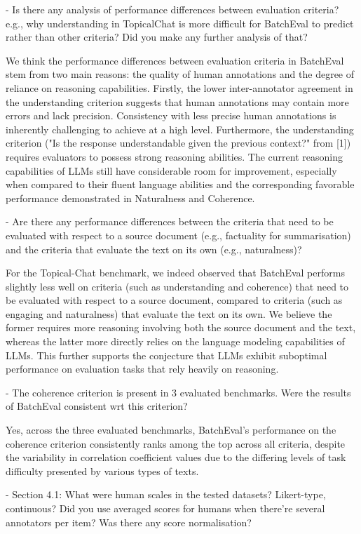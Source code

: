 - Is there any analysis of performance differences between evaluation criteria? e.g., why understanding in TopicalChat is more difficult for BatchEval to predict rather than other criteria? Did you make any further analysis of that?

We think the performance differences between evaluation criteria in BatchEval stem from two main reasons: the quality of human annotations and the degree of reliance on reasoning capabilities. Firstly, the lower inter-annotator agreement in the understanding criterion suggests that human annotations may contain more errors and lack precision. Consistency with less precise human annotations is inherently challenging to achieve at a high level. Furthermore, the understanding criterion ("Is the response understandable given the previous context?" from [1]) requires evaluators to possess strong reasoning abilities. The current reasoning capabilities of LLMs still have considerable room for improvement, especially when compared to their fluent language abilities and the corresponding favorable performance demonstrated in Naturalness and Coherence.

- Are there any performance differences between the criteria that need to be evaluated with respect to a source document (e.g., factuality for summarisation) and the criteria that evaluate the text on its own (e.g., naturalness)?

For the Topical-Chat benchmark, we indeed observed that BatchEval performs slightly less well on criteria (such as understanding and coherence) that need to be evaluated with respect to a source document, compared to criteria (such as engaging and naturalness) that evaluate the text on its own. We believe the former requires more reasoning involving both the source document and the text, whereas the latter more directly relies on the language modeling capabilities of LLMs. This further supports the conjecture that LLMs exhibit suboptimal performance on evaluation tasks that rely heavily on reasoning.

- The coherence criterion is present in 3 evaluated benchmarks. Were the results of BatchEval consistent wrt this criterion?

Yes, across the three evaluated benchmarks, BatchEval's performance on the coherence criterion consistently ranks among the top across all criteria, despite the variability in correlation coefficient values due to the differing levels of task difficulty presented by various types of texts.

- Section 4.1: What were human scales in the tested datasets? Likert-type, continuous? Did you use averaged scores for humans when there're several annotators per item? Was there any score normalisation?

